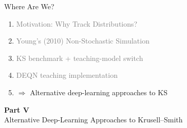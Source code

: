\documentclass[aspectratio=169,11pt]{beamer}
\newcommand{\emphc}[1]{\textcolor{harvardcrimson}{#1}}
\begin{document}
\begin{frame}{Where Are We?}
\begin{enumerate}
    \item \textcolor{gray}{Motivation: Why Track Distributions?} \checkmark
    \vspace{0.25em}
    \item \textcolor{gray}{Young's (2010) Non-Stochastic Simulation} \checkmark
    \vspace{0.25em}
    \item \textcolor{gray}{KS benchmark + teaching-model switch} \checkmark
    \vspace{0.25em}
    \item \textcolor{gray}{DEQN teaching implementation} \checkmark
    \vspace{0.25em}
    \item \emphc{$\Rightarrow$ Alternative deep-learning approaches to KS}
\end{enumerate}
\end{frame}


\begin{frame}{}
\vfill
\begin{center}
{\Huge \textcolor{uzhblue}{\textbf{Part V}}}\\[12pt]
{\LARGE Alternative Deep-Learning Approaches to Krusell--Smith}
\end{center}
\vfill
\end{frame}
\end{document}

